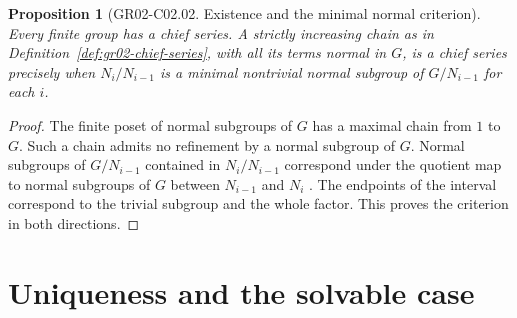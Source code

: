 \documentclass[11pt,oneside,openany]{book}
\newtheorem{proposition}[theorem]{Proposition}
\theoremstyle{definition}
\theoremstyle{remark}
\begin{document}
\begin{proposition}[GR02-C02.02. Existence and the minimal normal criterion]
\label{prop:gr02-chief-existence}
Every finite group has a chief series. A strictly increasing chain as
in Definition~\ref{def:gr02-chief-series}, with all its terms normal in
\(G\), is a chief series precisely when \(N_i/N_{i-1}\) is a minimal
nontrivial normal subgroup of \(G/N_{i-1}\) for each \(i\).
\end{proposition}
\begin{proof}
The finite poset of normal subgroups of \(G\) has a maximal chain
from \(1\) to \(G\). Such a chain admits no refinement by a normal
subgroup of \(G\). Normal subgroups of \(G/N_{i-1}\) contained in
\(N_i/N_{i-1}\) correspond under the quotient map to normal
subgroups of \(G\) between \(N_{i-1}\) and \(N_i\)
\cite[entry K07.04.correspondence\_theorem]{d07}. The endpoints of
the interval correspond to the trivial subgroup and the whole
factor. This proves the criterion in both directions.
\end{proof}

\section{Uniqueness and the solvable case}
\end{document}
